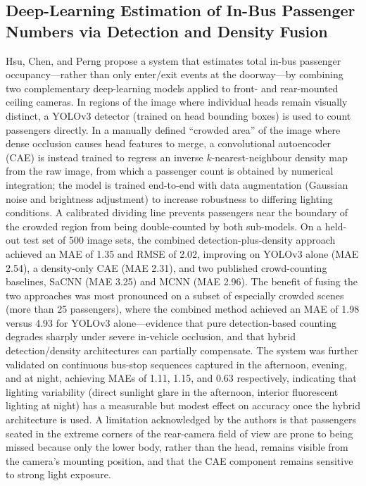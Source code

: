 \documentclass[12pt,a4paper]{report}
\begin{document}
\subsection{Deep-Learning Estimation of In-Bus Passenger Numbers via Detection and Density Fusion}

Hsu, Chen, and Perng propose a system that estimates total in-bus passenger occupancy---rather than only enter/exit events at the doorway---by combining two complementary deep-learning models applied to front- and rear-mounted ceiling cameras. In regions of the image where individual heads remain visually distinct, a YOLOv3 detector (trained on head bounding boxes) is used to count passengers directly. In a manually defined ``crowded area'' of the image where dense occlusion causes head features to merge, a convolutional autoencoder (CAE) is instead trained to regress an inverse $k$-nearest-neighbour density map from the raw image, from which a passenger count is obtained by numerical integration; the model is trained end-to-end with data augmentation (Gaussian noise and brightness adjustment) to increase robustness to differing lighting conditions. A calibrated dividing line prevents passengers near the boundary of the crowded region from being double-counted by both sub-models. On a held-out test set of 500 image sets, the combined detection-plus-density approach achieved an MAE of 1.35 and RMSE of 2.02, improving on YOLOv3 alone (MAE 2.54), a density-only CAE (MAE 2.31), and two published crowd-counting baselines, SaCNN (MAE 3.25) and MCNN (MAE 2.96). The benefit of fusing the two approaches was most pronounced on a subset of especially crowded scenes (more than 25 passengers), where the combined method achieved an MAE of 1.98 versus 4.93 for YOLOv3 alone---evidence that pure detection-based counting degrades sharply under severe in-vehicle occlusion, and that hybrid detection/density architectures can partially compensate. The system was further validated on continuous bus-stop sequences captured in the afternoon, evening, and at night, achieving MAEs of 1.11, 1.15, and 0.63 respectively, indicating that lighting variability (direct sunlight glare in the afternoon, interior fluorescent lighting at night) has a measurable but modest effect on accuracy once the hybrid architecture is used. A limitation acknowledged by the authors is that passengers seated in the extreme corners of the rear-camera field of view are prone to being missed because only the lower body, rather than the head, remains visible from the camera's mounting position, and that the CAE component remains sensitive to strong light exposure.
\end{document}
